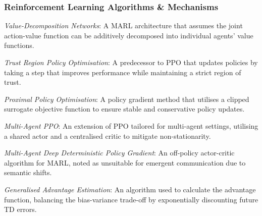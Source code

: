 {\subsubsection*{Reinforcement Learning Algorithms \& Mechanisms}
\begin{description}[labelwidth=2.5cm, leftmargin=2.7cm, style=multiline, noitemsep, topsep=0pt]
    \item[VDN] \textit{Value-Decomposition Networks}: A MARL architecture that assumes the joint action-value function can be additively decomposed into individual agents' value functions. \cite{VDN}
    \item[TRPO] \textit{Trust Region Policy Optimisation}: A predecessor to PPO that updates policies by taking a step that improves performance while maintaining a strict region of trust. \cite{TRPO}
    \item[PPO] \textit{Proximal Policy Optimisation}: A policy gradient method that utilises a clipped surrogate objective function to ensure stable and conservative policy updates. \cite{PPO, ppo_bestpractices}
    \item[MAPPO] \textit{Multi-Agent PPO}: An extension of PPO tailored for multi-agent settings, utilising a shared actor and a centralised critic to mitigate non-stationarity. \cite{MAPPO}
    \item[MADDPG] \textit{Multi-Agent Deep Deterministic Policy Gradient}: An off-policy actor-critic algorithm for MARL, noted as unsuitable for emergent communication due to semantic shifts. \cite{MADDPG}
    \item[GAE] \textit{Generalised Advantage Estimation}: An algorithm used to calculate the advantage function, balancing the bias-variance trade-off by exponentially discounting future TD errors. \cite{formal-gae, gae_normalisation}
\end{description}

\vspace{-5pt}
}
